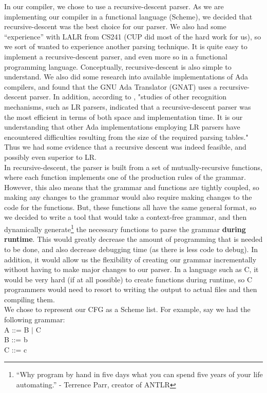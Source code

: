\documentclass[onecolumn,11pt]{article}
\begin{document}
In our compiler, we chose to use a recursive-descent parser. As we are implementing our compiler in a functional language (Scheme), we decided that recursive-descent was the best choice for our parser. We also had some ``experience'' with LALR from CS241 (CUP did most of the hard work for us), so we sort of wanted to experience another parsing technique. It is quite easy to implement a recursive-descent parser, and even more so in a functional programming language. Conceptually, recursive-descent is also simple to understand. We also did some research into available implementations of Ada compilers, and found that the GNU Ada Translator (GNAT) uses a recursive-descent parser. In addition, according to \cite{olsen82}, "studies of other recognition mechanisms, such as LR parsers, indicated that a recursive-descent parser was the most efficient in terms of both space and implementation time. It is our understanding that other Ada implementations employing LR parsers have encountered difficulties resulting from the size of the required parsing tables." Thus we had some evidence that a recursive descent was indeed feasible, and possibly even superior to LR. \\

In recursive-descent, the parser is built from a set of mutually-recursive functions, where each function implements one of the production rules of the grammar. However, this also means that the grammar and functions are tightly coupled, so making any changes to the grammar would also require making changes to the code for the functions. But, these functions all have the same general format, so we decided to write a tool that would take a context-free grammar, and then dynamically generate\footnote{``Why program by hand in five days what you can spend five years of your life automating.'' - Terrence Parr, creator of ANTLR} the necessary functions to parse the grammar \textbf{during runtime}. This would greatly decrease the amount of programming that is needed to be done, and also decrease debugging time (as there is less code to debug). In addition, it would allow us the flexibility of creating our grammar incrementally without having to make major changes to our parser. In a language such as C, it would be very hard (if at all possible) to create functions during runtime, so C programmers would need to resort to writing the output to actual files and then compiling them. \\

We chose to represent our CFG as a Scheme list. For example, say we had the following grammar: \\
A ::= B $\mid$ C \\
B ::= b \\
C ::= c \\
\end{document}
